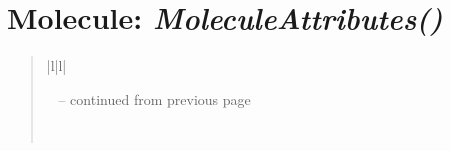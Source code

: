 \documentclass[letterpaper,10pt,english]{sphinxmanual}
\begin{document}
\section{\textbf{Molecule}: \emph{MoleculeAttributes()}}
\label{attributes:molecule-moleculeattributes}
\begin{DUlineblock}{0em}
\item[] 
\end{DUlineblock}
\begin{quote}

\begin{longtable}{|l|l|}
\hline
\endfirsthead

%
{{\textsf{\tablename\ \thetable{} -- continued from previous page}}} \\
\hline
\endhead

\hline {} \\ \hline
\endfoot

\endlastfoot



\end{longtable}
\end{quote}
\end{document}
